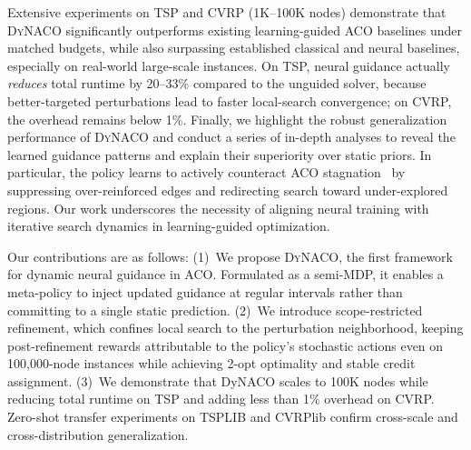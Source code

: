 \documentclass[sigconf]{acmart}
\newcommand{\DyNACO}{\textsc{DyNACO}}
\begin{document}
Extensive experiments on TSP and CVRP (1K–100K nodes) demonstrate that \DyNACO{} significantly outperforms existing learning-guided ACO baselines under matched budgets, while also surpassing established classical and neural baselines, especially on real-world large-scale instances. On TSP, neural guidance actually \emph{reduces} total runtime by 20--33\% compared to the unguided solver, because better-targeted perturbations lead to faster local-search convergence; on CVRP, the overhead remains below 1\%. Finally, we highlight the robust generalization performance of \DyNACO{} and conduct a series of in-depth analyses to reveal the learned guidance patterns and explain their superiority over static priors. In particular, the policy learns to actively counteract ACO stagnation~\cite{stagnation} by suppressing over-reinforced edges and redirecting search toward under-explored regions. Our work underscores the necessity of aligning neural training with iterative search dynamics in learning-guided optimization.

Our contributions are as follows:
(1)~We propose \DyNACO{}, the first framework for dynamic neural guidance in ACO. Formulated as a semi-MDP, it enables a meta-policy to inject updated guidance at regular intervals rather than committing to a single static prediction.
(2)~We introduce scope-restricted refinement, which confines local search to the perturbation neighborhood, keeping post-refinement rewards attributable to the policy's stochastic actions even on 100,000-node instances while achieving 2-opt optimality and stable credit assignment.
(3)~We demonstrate that DyNACO scales to 100K nodes while reducing total runtime on TSP and adding less than 1\% overhead on CVRP. Zero-shot transfer experiments on TSPLIB and CVRPlib confirm cross-scale and cross-distribution generalization.


\end{document}
